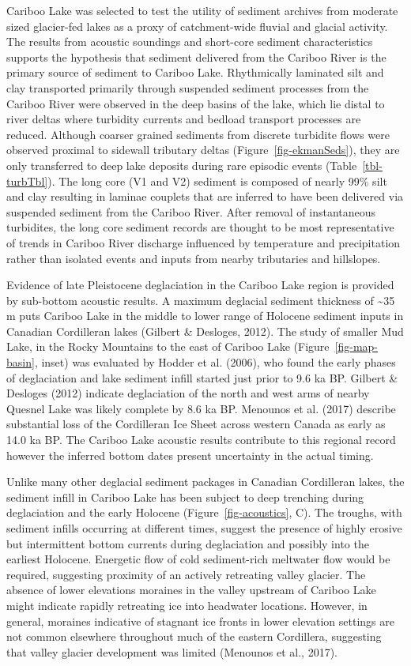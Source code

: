 \documentclass[
  letterpaper,
  DIV=11,
  numbers=noendperiod]{scrartcl}
\begin{document}
Cariboo Lake was selected to test the utility of sediment archives from
moderate sized glacier-fed lakes as a proxy of catchment-wide fluvial
and glacial activity. The results from acoustic soundings and short-core
sediment characteristics supports the hypothesis that sediment delivered
from the Cariboo River is the primary source of sediment to Cariboo
Lake. Rhythmically laminated silt and clay transported primarily through
suspended sediment processes from the Cariboo River were observed in the
deep basins of the lake, which lie distal to river deltas where
turbidity currents and bedload transport processes are reduced. Although
coarser grained sediments from discrete turbidite flows were observed
proximal to sidewall tributary deltas (Figure~\ref{fig-ekmanSeds}), they
are only transferred to deep lake deposits during rare episodic events
(Table~\ref{tbl-turbTbl}). The long core (V1 and V2) sediment is
composed of nearly 99\% silt and clay resulting in laminae couplets that
are inferred to have been delivered via suspended sediment from the
Cariboo River. After removal of instantaneous turbidites, the long core
sediment records are thought to be most representative of trends in
Cariboo River discharge influenced by temperature and precipitation
rather than isolated events and inputs from nearby tributaries and
hillslopes.

Evidence of late Pleistocene deglaciation in the Cariboo Lake region is
provided by sub-bottom acoustic results. A maximum deglacial sediment
thickness of \textasciitilde35 m puts Cariboo Lake in the middle to
lower range of Holocene sediment inputs in Canadian Cordilleran lakes
(Gilbert \& Desloges, 2012). The study of smaller Mud Lake, in the Rocky
Mountains to the east of Cariboo Lake (Figure~\ref{fig-map-basin},
inset) was evaluated by Hodder et al. (2006), who found the early phases
of deglaciation and lake sediment infill started just prior to 9.6 ka
BP. Gilbert \& Desloges (2012) indicate deglaciation of the north and
west arms of nearby Quesnel Lake was likely complete by 8.6 ka BP.
Menounos et al. (2017) describe substantial loss of the Cordilleran Ice
Sheet across western Canada as early as 14.0 ka BP. The Cariboo Lake
acoustic results contribute to this regional record however the inferred
bottom dates present uncertainty in the actual timing.

Unlike many other deglacial sediment packages in Canadian Cordilleran
lakes, the sediment infill in Cariboo Lake has been subject to deep
trenching during deglaciation and the early Holocene
(Figure~\ref{fig-acoustics}, C). The troughs, with sediment infills
occurring at different times, suggest the presence of highly erosive but
intermittent bottom currents during deglaciation and possibly into the
earliest Holocene. Energetic flow of cold sediment-rich meltwater flow
would be required, suggesting proximity of an actively retreating valley
glacier. The absence of lower elevations moraines in the valley upstream
of Cariboo Lake might indicate rapidly retreating ice into headwater
locations. However, in general, moraines indicative of stagnant ice
fronts in lower elevation settings are not common elsewhere throughout
much of the eastern Cordillera, suggesting that valley glacier
development was limited (Menounos et al., 2017).
\end{document}
